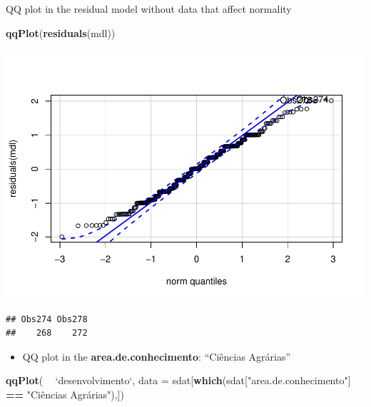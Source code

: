 \documentclass[]{article}
\newenvironment{Shaded}{\begin{snugshade}}{\end{snugshade}}
\newcommand{\DataTypeTok}[1]{\textcolor[rgb]{0.13,0.29,0.53}{#1}}
\newcommand{\KeywordTok}[1]{\textcolor[rgb]{0.13,0.29,0.53}{\textbf{#1}}}
\newcommand{\NormalTok}[1]{#1}
\newcommand{\OperatorTok}[1]{\textcolor[rgb]{0.81,0.36,0.00}{\textbf{#1}}}
\newcommand{\StringTok}[1]{\textcolor[rgb]{0.31,0.60,0.02}{#1}}
\providecommand{\tightlist}{%
  \setlength{\itemsep}{0pt}\setlength{\parskip}{0pt}}
\begin{document}
QQ plot in the residual model without data that affect normality

\begin{Shaded}
\begin{Highlighting}[]
\KeywordTok{qqPlot}\NormalTok{(}\KeywordTok{residuals}\NormalTok{(mdl))}
\end{Highlighting}
\end{Shaded}

\includegraphics{factorialAnova_files/figure-latex/unnamed-chunk-21-1.pdf}

\begin{verbatim}
## Obs274 Obs278 
##    268    272
\end{verbatim}

\begin{itemize}
\tightlist
\item
  QQ plot in the \textbf{area.de.conhecimento}: ``Ciências Agrárias''
\end{itemize}

\begin{Shaded}
\begin{Highlighting}[]
\KeywordTok{qqPlot}\NormalTok{( }\OperatorTok{~}\StringTok{ `}\DataTypeTok{desenvolvimento}\StringTok{`}\NormalTok{, }\DataTypeTok{data =}\NormalTok{ sdat[}\KeywordTok{which}\NormalTok{(sdat[}\StringTok{"area.de.conhecimento"}\NormalTok{] }\OperatorTok{==}\StringTok{ "Ciências Agrárias"}\NormalTok{),])}
\end{Highlighting}
\end{Shaded}
\end{document}
